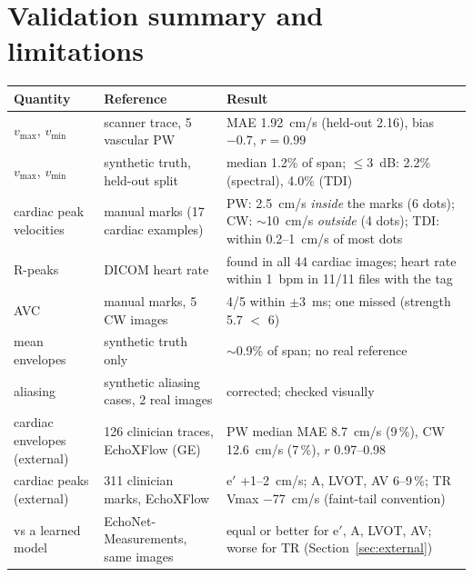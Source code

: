 \documentclass[10pt,a4paper]{article}
\newcommand{\vmax}{v_{\max}}
\newcommand{\vmin}{v_{\min}}
\begin{document}
\section{Validation summary and limitations}
\label{sec:limits}
\begin{center}\small
\begin{tabularx}{\linewidth}{@{}lLL@{}}
\toprule
Quantity & Reference & Result \\ \midrule
$\vmax$, $\vmin$ & scanner trace, 5 vascular PW & MAE 1.92~cm/s (held-out 2.16), bias $-0.7$, $r=0.99$ \\
$\vmax$, $\vmin$ & synthetic truth, held-out split & median 1.2\% of span; $\le$3~dB: 2.2\% (spectral), 4.0\% (TDI) \\
cardiac peak velocities & manual marks (17 cardiac examples) & PW: 2.5~cm/s \emph{inside} the marks (6 dots); CW: $\sim$10~cm/s \emph{outside} (4 dots); TDI: within 0.2--1~cm/s of most dots \\
R-peaks & DICOM heart rate & found in all 44 cardiac images; heart rate within 1~bpm in 11/11 files with the tag \\
AVC & manual marks, 5 CW images & 4/5 within $\pm3$~ms; one missed (strength 5.7 $<$ 6) \\
mean envelopes & synthetic truth only & $\sim$0.9\% of span; no real reference \\
aliasing & synthetic aliasing cases, 2 real images & corrected; checked visually \\
cardiac envelopes (external) & 126 clinician traces, EchoXFlow (GE) & PW median MAE 8.7~cm/s (9\,\%), CW 12.6~cm/s (7\,\%), $r$ 0.97--0.98 \\
cardiac peaks (external) & 311 clinician marks, EchoXFlow & e$'$ +1--2~cm/s; A, LVOT, AV 6--9\,\%; TR Vmax $-$77~cm/s (faint-tail convention) \\
vs a learned model & EchoNet-Measurements, same images & equal or better for e$'$, A, LVOT, AV; worse for TR (Section~\ref{sec:external}) \\
\bottomrule
\end{tabularx}
\end{center}
\end{document}
